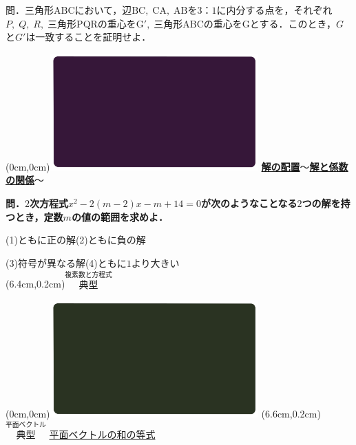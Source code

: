 \documentclass[10pt,
fleqn,
dvipdfmx,
uplatex
]{jsarticle}
\begin{document}
\large 
問．三角形$\text{ABC}$において，辺$\text{BC},\;\text{CA},\;\text{AB}$を$3：1$に内分する点を，それぞれ$P,\;Q,\;R,\;$三角形$\text{PQR}$の重心を$\text{G}',\;$三角形$\text{ABC}$の重心を$\text{G}$とする．このとき，$G$と$G'$は一致することを証明せよ．


\newpage

\at(0cm,0cm){\includegraphics[width=8cm,bb=0 0 1920 1080]{./youtube/thumbnails/templates/smart_background/複素数と方程式.jpeg}}
{\color{orange}\bf\boldmath\Large\underline{解の配置$〜$解と係数の関係$〜$}}\vspace{0.3zw}

\normalsize 
\bf\boldmath 問．$2$次方程式$x^2-2\left(m-2\right)x-m+{14}=0$が次のようなことなる$2$つの解を持つとき，定数$m$の値の範囲を求めよ．

\Large
(1)ともに正の解\hspace{0.2zw}(2)ともに負の解\vspace{0.2zw}

\normalsize
\hspace{0.2zw}(3)符号が異なる解\hspace{1.5zw}(4)ともに$1$より大きい\\

\at(6.4cm,0.2cm){\small\color{bradorange}$\overset{\text{複素数と方程式}}{\text{典型}}$}

\newpage



\at(0cm,0cm){\includegraphics[width=8cm,bb=0 0 1920 1080]{./youtube/thumbnails/templates/smart_background/平面ベクトル.jpeg}}
\at(6.6cm,0.2cm){\small\color{bradorange}$\overset{\text{平面ベクトル}}{\text{典型}}$}
{\color{orange}\LARGE\underline{平面ベクトルの和の等式}}\vspace{0.3zw}
\end{document}
